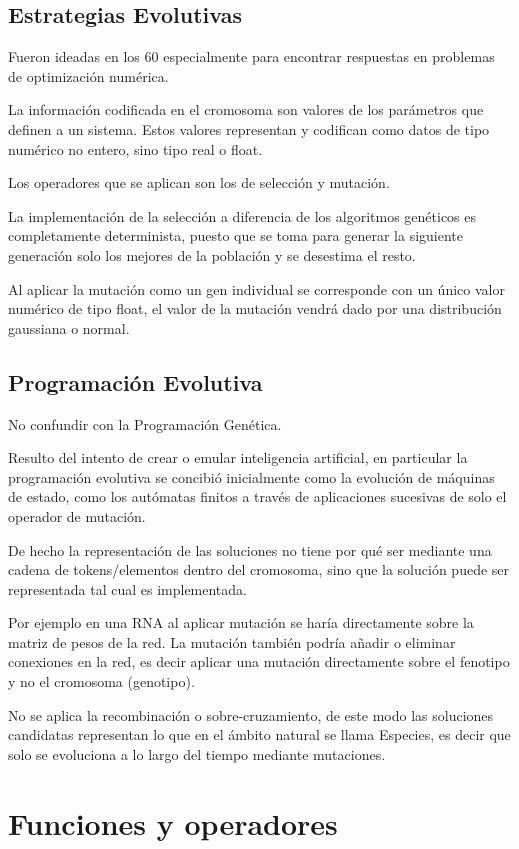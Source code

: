 \documentclass[12pt, twoside, openright]{report} %
\begin{document}
\subsection{Estrategias Evolutivas}
Fueron ideadas en los 60 especialmente para encontrar respuestas en problemas de optimización numérica.

La información codificada en el cromosoma son valores de los parámetros que definen a un sistema. Estos valores representan y codifican como datos de tipo numérico no entero, sino tipo real o float.

Los operadores que se aplican son los de selección y mutación.

La implementación de la selección a diferencia de los algoritmos genéticos es completamente determinista, puesto que se toma para generar la siguiente generación solo los mejores de la población y se desestima el resto.

Al aplicar la mutación como un gen individual se corresponde con un único valor numérico de tipo float, el valor de la mutación vendrá dado por una distribución gaussiana o normal.

\subsection{Programación Evolutiva}
No confundir con la Programación Genética.

Resulto del intento de crear o emular inteligencia artificial, en particular la programación evolutiva se concibió inicialmente como la evolución de máquinas de estado, como los autómatas finitos a través de aplicaciones sucesivas de solo el operador de mutación.

De hecho la representación de las soluciones no tiene por qué ser mediante una cadena de tokens/elementos dentro del cromosoma, sino que la solución puede ser representada tal cual es implementada.

Por ejemplo en una RNA al aplicar mutación se haría directamente sobre la matriz de pesos de la red. La mutación también podría añadir o eliminar conexiones en la red, es decir aplicar una mutación directamente sobre el fenotipo y no el cromosoma (genotipo).

No se aplica la recombinación o sobre-cruzamiento, de este modo las soluciones candidatas representan lo que en el ámbito natural se llama Especies, es decir que solo se evoluciona a lo largo del tiempo mediante mutaciones.

\section{Funciones y operadores}
\end{document}
